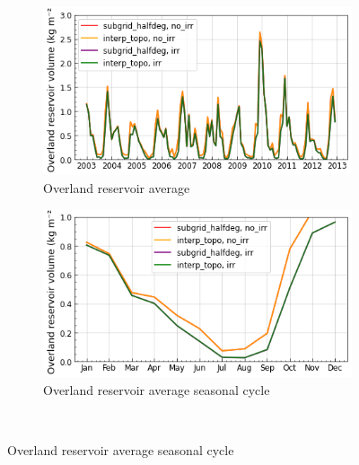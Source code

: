 \begin{figure}[htbp]
    \begin{subfigure}[b]{0.48\textwidth}
        \caption{Overland reservoir average}
        \includegraphics[width=\textwidth]{images/chap3/time_series/cont_fastr_time_series.png}
    \end{subfigure}
    \begin{subfigure}[b]{0.48\textwidth}
        \caption{Overland reservoir average seasonal cycle}
        \includegraphics[width=\textwidth]{images/chap3/time_series/cont_fastr_seasonal_cycle.png}
    \end{subfigure} \\
    

\end{figure}
